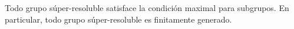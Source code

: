 
%
%
%
%
%
%
%
%	

\begin{proposition}
	\label{proposition:superfg}
	Todo grupo súper-resoluble satisface la condición maximal para subgrupos. En
	particular, todo grupo súper-resoluble es finitamente generado.
\end{proposition}

